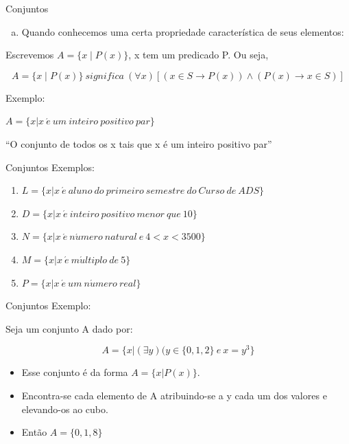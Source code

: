 \documentclass[aspectratio=169]{beamer}
\begin{document}
\begin{frame}{Conjuntos}
    \begin{enumerate}[b)]
        \item Quando conhecemos uma certa propriedade característica de seus elementos:
    \end{enumerate}
    
    \vspace{4mm}

Escrevemos $A = \{ x \mid P(x) \}$, x tem um predicado P. Ou seja,

\[ A = \{x \mid P(x)\} ~ significa ~ (\forall x)[(x \in S \rightarrow P(x)) \land (P(x) \rightarrow x \in S)] \]

\vspace{4mm}
Exemplo:

\vspace{2mm}
$A= \{ x \vert x ~ \acute{e} ~ um ~ inteiro ~ positivo ~ par \}$

\vspace{4mm}
``O conjunto de todos os x tais que x é um inteiro positivo par''

\end{frame}

\begin{frame}{Conjuntos}
    Exemplos:
    \vspace{4mm}

    \begin{enumerate}
        \item $L = \{x \vert x ~ \acute{e} ~ aluno ~ do ~ primeiro ~ semestre ~ do ~ Curso ~ de ~ ADS\}$
        \item $D = \{x \vert x ~ \acute{e} ~ inteiro ~ positivo ~ menor ~ que ~ 10 \}$
        \item $N = \{x|x ~ \acute{e} ~ n\acute{u}mero ~ natural ~ e ~ 4 < x < 3500\}$
        \item $M = \{x|x ~ \acute{e} ~ m\acute{u}ltiplo ~ de ~ 5\}$
        \item $P = \{x|x ~ \acute{e} ~ um ~ n\acute{u}mero ~ real\}$
    \end{enumerate}

\end{frame}

\begin{frame}{Conjuntos}
    Exemplo:
    \vspace{4mm}
    
    Seja um conjunto A dado por:

    \[ A = \{x | (\exists y)(y \in \{0, 1, 2\} ~ e ~ x = y^3\} \]

    \begin{itemize}
        \item Esse conjunto é da forma $A=\{x|P(x)\}$.
        \item Encontra-se cada elemento de A atribuindo-se a y cada um dos valores e elevando-os ao cubo.
        \item Então $A = \{0, 1, 8\}$
    \end{itemize}
\end{frame}
\end{document}
